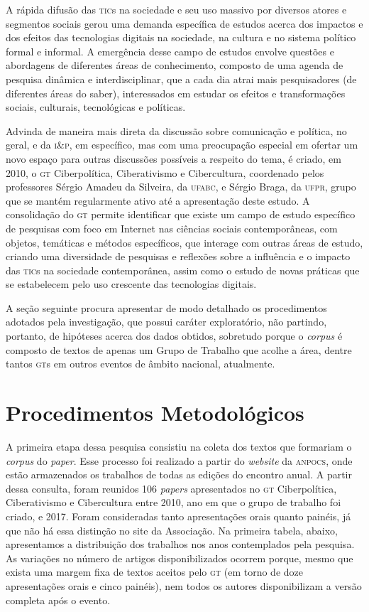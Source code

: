 {A rápida difusão das \textsc{tic}s na sociedade e seu uso massivo por diversos
atores e segmentos sociais gerou uma demanda específica de estudos
acerca dos impactos e dos efeitos das tecnologias digitais na sociedade,
na cultura e no sistema político formal e informal. A emergência desse
campo de estudos envolve questões e abordagens de diferentes áreas de
conhecimento, composto de uma agenda de pesquisa dinâmica e
interdisciplinar, que a cada dia atrai mais pesquisadores (de diferentes
áreas do saber), interessados em estudar os efeitos e transformações
sociais, culturais, tecnológicas e políticas.

Advinda de maneira mais direta da discussão sobre comunicação e
política, no geral, e da \textsc{i\&p}, em específico, mas com uma
preocupação especial em ofertar um novo espaço para outras discussões
possíveis a respeito do tema, é criado, em 2010, o \textsc{gt} Ciberpolítica,
Ciberativismo e Cibercultura, coordenado pelos professores Sérgio
Amadeu da Silveira, da \textsc{ufabc}, e Sérgio Braga, da \textsc{ufpr}, grupo que se
mantém regularmente ativo até a apresentação deste estudo. A
consolidação do \textsc{gt} permite identificar que existe um campo de estudo
específico de pesquisas com foco em Internet nas ciências sociais
contemporâneas, com objetos, temáticas e métodos específicos, que
interage com outras áreas de estudo, criando uma diversidade de
pesquisas e reflexões sobre a influência e o impacto das \textsc{tic}s na
sociedade contemporânea, assim como o estudo de novas práticas que se
estabelecem pelo uso crescente das tecnologias digitais.

A seção seguinte procura apresentar de modo detalhado os procedimentos
adotados pela investigação, que possui caráter exploratório, não
partindo, portanto, de hipóteses acerca dos dados obtidos, sobretudo
porque o \textit{corpus} é composto de textos de apenas um Grupo de
Trabalho que acolhe a área, dentre tantos \textsc{gt}s em outros eventos de
âmbito nacional, atualmente.

\section{Procedimentos Metodológicos}

A primeira etapa dessa pesquisa consistiu na coleta dos textos que
formariam o \textit{corpus} do \textit{paper}. Esse processo foi realizado a
partir do \textit{website} da \textsc{anpocs}, onde estão armazenados os trabalhos de todas as edições do encontro
anual. A partir dessa consulta, foram reunidos 106
\textit{papers} apresentados no \textsc{gt} Ciberpolítica, Ciberativismo e
Cibercultura entre 2010, ano em que o grupo de trabalho foi criado, e
2017. Foram consideradas tanto apresentações orais quanto painéis, já
que não há essa distinção no site da Associação. Na primeira tabela, abaixo,
apresentamos a distribuição dos trabalhos nos anos contemplados pela
pesquisa. As variações no número de artigos disponibilizados ocorrem
porque, mesmo que exista uma margem fixa de textos aceitos pelo \textsc{gt} (em
torno de doze apresentações orais e cinco painéis), nem todos os
autores disponibilizam a versão completa após o evento.
\enlargethispage{\baselineskip}


}

